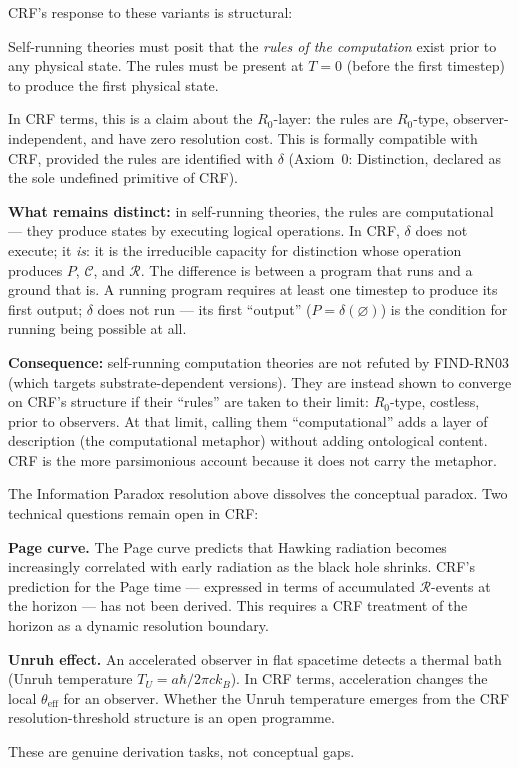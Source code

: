 \documentclass[12pt, a4paper]{article}
\begin{document}
CRF's response to these variants is structural:

\begin{formalbox}[title={CRF vs Self-Running Computation Theories}]
Self-running theories must posit that the \emph{rules of the
computation} exist prior to any physical state. The rules must be
present at $T = 0$ (before the first timestep) to produce the
first physical state.

In CRF terms, this is a claim about the $R_0$-layer: the rules
are $R_0$-type, observer-independent, and have zero resolution
cost. This is formally compatible with CRF, provided the rules
are identified with $\delta$ (Axiom~0: Distinction, declared as
the sole undefined primitive of CRF).

\textbf{What remains distinct:} in self-running theories, the
rules are computational --- they produce states by executing
logical operations. In CRF, $\delta$ does not execute; it
\emph{is}: it is the irreducible capacity for distinction whose
operation produces $P$, $\mathcal{C}$, and $\mathcal{R}$.
The difference is between a program that runs and a ground that
is. A running program requires at least one timestep to produce
its first output; $\delta$ does not run --- its first
``output'' ($P = \delta(\varnothing)$) is the condition for
running being possible at all.

\textbf{Consequence:} self-running computation theories are not
refuted by FIND-RN03 (which targets substrate-dependent versions).
They are instead shown to converge on CRF's structure if their
``rules'' are taken to their limit: $R_0$-type, costless,
prior to observers. At that limit, calling them ``computational''
adds a layer of description (the computational metaphor) without
adding ontological content. CRF is the more parsimonious
account because it does not carry the metaphor.
\end{formalbox}

\begin{openqbox}[title={Open: The Page Curve and Unruh Effect}]
The Information Paradox resolution above dissolves the conceptual
paradox. Two technical questions remain open in CRF:

\textbf{Page curve.} The Page curve predicts that Hawking
radiation becomes increasingly correlated with early radiation
as the black hole shrinks. CRF's prediction for the Page time
--- expressed in terms of accumulated $\mathcal{R}$-events at
the horizon --- has not been derived. This requires a CRF
treatment of the horizon as a dynamic resolution boundary.

\textbf{Unruh effect.} An accelerated observer in flat spacetime
detects a thermal bath (Unruh temperature $T_U = a\hbar/2\pi c k_B$).
In CRF terms, acceleration changes the local $\theta_{\mathrm{eff}}$
for an observer. Whether the Unruh temperature emerges from the
CRF resolution-threshold structure is an open programme.

These are genuine derivation tasks, not conceptual gaps.
\end{openqbox}
\end{document}
